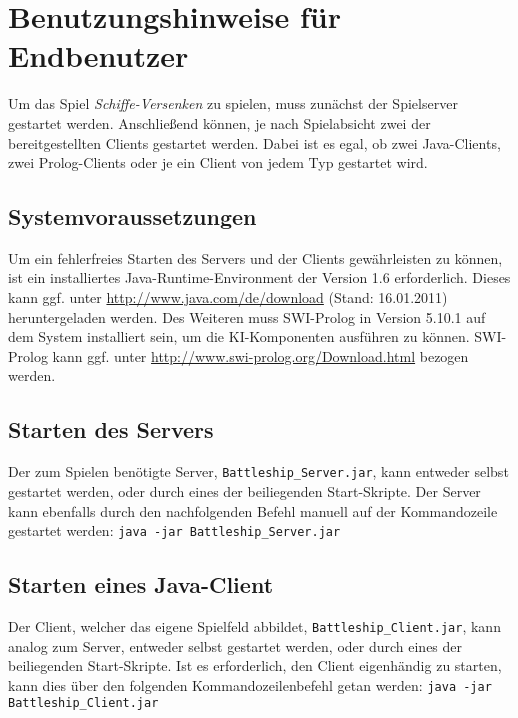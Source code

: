 \section{Benutzungshinweise für Endbenutzer} \label{sec:Endbenutzer}
	Um das Spiel \textit{Schiffe-Versenken} zu spielen, muss zunächst der Spielserver gestartet werden. Anschließend können, je nach
	Spielabsicht zwei der bereitgestellten Clients gestartet werden. Dabei ist es egal, ob zwei Java-Clients, zwei Prolog-Clients oder
	je ein Client von jedem Typ gestartet wird. 
	
	\subsection{Systemvoraussetzungen} %
	\label{sub:systemvoraussetzungen}
		Um ein fehlerfreies Starten des Servers und der Clients gewährleisten zu können, ist ein installiertes Java-Runtime-Environment 
		der Version 1.6 erforderlich. Dieses kann ggf. unter \url{http://www.java.com/de/download} (Stand: 16.01.2011) heruntergeladen werden.
		\newline
		Des Weiteren muss SWI-Prolog in Version 5.10.1 auf dem System installiert sein, um die KI-Komponenten ausführen zu können. SWI-Prolog 
		kann ggf. unter \url{http://www.swi-prolog.org/Download.html} bezogen werden.
	
\subsection{Starten des Servers}
	Der zum Spielen benötigte Server, \texttt{Battleship\_Server.jar}, kann entweder selbst gestartet werden, oder 
	durch eines der beiliegenden Start-Skripte.
	Der Server kann ebenfalls durch den nachfolgenden Befehl manuell auf der Kommandozeile gestartet werden: \newline
	\texttt{java -jar Battleship\_Server.jar}\newline

\subsection{Starten eines Java-Client}
	Der Client, welcher das eigene Spielfeld abbildet, \texttt{Battleship\_Client.jar}, kann analog zum Server, entweder selbst gestartet werden, oder 
	durch eines der beiliegenden Start-Skripte.
	Ist es erforderlich, den Client eigenhändig zu starten, kann dies über den folgenden Kommandozeilenbefehl getan werden:\newline
	\texttt{java -jar Battleship\_Client.jar}\newline

